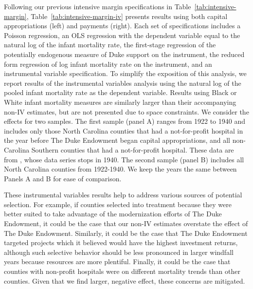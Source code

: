 \documentclass[12pt]{article}
\begin{document}
Following our previous intensive margin specifications in Table~\ref{tab:intensive-margin},  Table~\ref{tab:intensive-margin-iv} presents results using both capital appropriations (left) and payments (right). 
Each set of specifications includes a Poisson regression, an OLS regression with the dependent variable equal to the natural log of the infant mortality rate, the first-stage regression of the potentially endogenous measure of Duke support on the instrument, the reduced form regression of log infant mortality rate on the instrument, and an instrumental variable specification. 
To simplify the exposition of this analysis, we report results of the instrumental variables analysis using the natural log of the pooled infant mortality rate as the dependent variable. 
Results using Black or White infant mortality measures are similarly larger than their accompanying non-IV estimates, but are not presented due to space constraints. 
We consider the effects for two samples. 
The first sample (panel A) ranges from 1922 to 1940 and includes only those North Carolina counties that had a not-for-profit hospital in the year before The Duke Endowment began capital appropriations, and all non-Carolina Southern counties that had a not-for-profit hospital.
These data are from , whose data series stops in 1940. 
The second sample (panel B) includes all North Carolina counties from 1922-1940. 
We keep the years the same between Panels A and B for ease of comparison. 


These instrumental variables results help to address various sources of potential selection. 
For example, if counties selected into treatment because they were better suited to take advantage of the modernization efforts of The Duke Endowment, it could be the case that our non-IV estimates overstate the effect of The Duke Endowment. 
Similarly, it could be the case that The Duke Endowment targeted projects which it believed would have the highest investment returns, although such selective behavior should be less pronounced in larger windfall years because resources are more plentiful. 
Finally, it could be the case that counties with non-profit hospitals were on different mortality trends than other counties. 
Given that we find larger, negative effect, these concerns are mitigated. 
\end{document}

